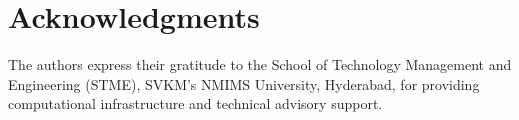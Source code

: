 \documentclass[11pt,a4paper]{article}
\begin{document}
\section*{Acknowledgments}
The authors express their gratitude to the School of Technology Management and Engineering (STME), SVKM's NMIMS University, Hyderabad, for providing computational infrastructure and technical advisory support.



\end{document}
